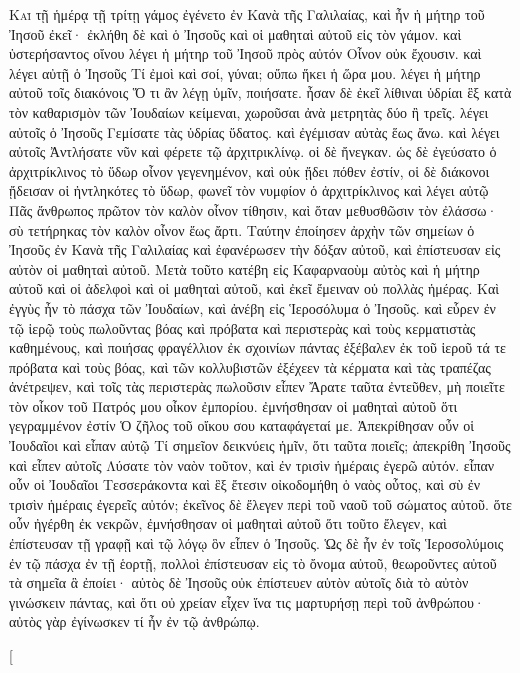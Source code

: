 \begin{pages}
    \begin{Rightside}
        \beginnumbering
		\renewcommand{\LettrineFontHook}{\PHtitl}
		\lettrine[lines=3]{Κ}{αὶ} τῇ ἡμέρᾳ τῇ τρίτῃ γάμος ἐγένετο ἐν Κανὰ τῆς Γαλιλαίας, καὶ ἦν ἡ μήτηρ τοῦ Ἰησοῦ ἐκεῖ· ἐκλήθη δὲ καὶ ὁ Ἰησοῦς καὶ οἱ μαθηταὶ αὐτοῦ εἰς τὸν γάμον. καὶ ὑστερήσαντος οἴνου λέγει ἡ μήτηρ τοῦ Ἰησοῦ πρὸς αὐτόν Οἶνον οὐκ ἔχουσιν. καὶ λέγει αὐτῇ ὁ Ἰησοῦς Τί ἐμοὶ καὶ σοί, γύναι; οὔπω ἥκει ἡ ὥρα μου. λέγει ἡ μήτηρ αὐτοῦ τοῖς διακόνοις Ὅ τι ἂν λέγῃ ὑμῖν, ποιήσατε. ἦσαν δὲ ἐκεῖ λίθιναι ὑδρίαι ἓξ κατὰ τὸν καθαρισμὸν τῶν Ἰουδαίων κείμεναι, χωροῦσαι ἀνὰ μετρητὰς δύο ἢ τρεῖς. λέγει αὐτοῖς ὁ Ἰησοῦς Γεμίσατε τὰς ὑδρίας ὕδατος. καὶ ἐγέμισαν αὐτὰς ἕως ἄνω. καὶ λέγει αὐτοῖς Ἀντλήσατε νῦν καὶ φέρετε τῷ ἀρχιτρικλίνῳ. οἱ δὲ ἤνεγκαν. ὡς δὲ ἐγεύσατο ὁ ἀρχιτρίκλινος τὸ ὕδωρ οἶνον γεγενημένον, καὶ οὐκ ᾔδει πόθεν ἐστίν, οἱ δὲ διάκονοι ᾔδεισαν οἱ ἠντληκότες τὸ ὕδωρ, φωνεῖ τὸν νυμφίον ὁ ἀρχιτρίκλινος καὶ λέγει αὐτῷ Πᾶς ἄνθρωπος πρῶτον τὸν καλὸν οἶνον τίθησιν, καὶ ὅταν μεθυσθῶσιν τὸν ἐλάσσω· σὺ τετήρηκας τὸν καλὸν οἶνον ἕως ἄρτι. Ταύτην ἐποίησεν ἀρχὴν τῶν σημείων ὁ Ἰησοῦς ἐν Κανὰ τῆς Γαλιλαίας καὶ ἐφανέρωσεν τὴν δόξαν αὐτοῦ, καὶ ἐπίστευσαν εἰς αὐτὸν οἱ μαθηταὶ αὐτοῦ.
		\pend
		\pstart
		Μετὰ τοῦτο κατέβη εἰς Καφαρναοὺμ αὐτὸς καὶ ἡ μήτηρ αὐτοῦ καὶ οἱ ἀδελφοὶ καὶ οἱ μαθηταὶ αὐτοῦ, καὶ ἐκεῖ ἔμειναν οὐ πολλὰς ἡμέρας. Καὶ ἐγγὺς ἦν τὸ πάσχα τῶν Ἰουδαίων, καὶ ἀνέβη εἰς Ἱεροσόλυμα ὁ Ἰησοῦς. καὶ εὗρεν ἐν τῷ ἱερῷ τοὺς πωλοῦντας βόας καὶ πρόβατα καὶ περιστερὰς καὶ τοὺς κερματιστὰς καθημένους, καὶ ποιήσας φραγέλλιον ἐκ σχοινίων πάντας ἐξέβαλεν ἐκ τοῦ ἱεροῦ τά τε πρόβατα καὶ τοὺς βόας, καὶ τῶν κολλυβιστῶν ἐξέχεεν τὰ κέρματα καὶ τὰς τραπέζας ἀνέτρεψεν, καὶ τοῖς τὰς περιστερὰς πωλοῦσιν εἶπεν Ἄρατε ταῦτα ἐντεῦθεν, μὴ ποιεῖτε τὸν οἶκον τοῦ Πατρός μου οἶκον ἐμπορίου. ἐμνήσθησαν οἱ μαθηταὶ αὐτοῦ ὅτι γεγραμμένον ἐστίν Ὁ ζῆλος τοῦ οἴκου σου καταφάγεταί με. 
		\pend
		\pstart
		Ἀπεκρίθησαν οὖν οἱ Ἰουδαῖοι καὶ εἶπαν αὐτῷ Τί σημεῖον δεικνύεις ἡμῖν, ὅτι ταῦτα ποιεῖς; ἀπεκρίθη Ἰησοῦς καὶ εἶπεν αὐτοῖς Λύσατε τὸν ναὸν τοῦτον, καὶ ἐν τρισὶν ἡμέραις ἐγερῶ αὐτόν. εἶπαν οὖν οἱ Ἰουδαῖοι Τεσσεράκοντα καὶ ἓξ ἔτεσιν οἰκοδομήθη ὁ ναὸς οὗτος, καὶ σὺ ἐν τρισὶν ἡμέραις ἐγερεῖς αὐτόν; ἐκεῖνος δὲ ἔλεγεν περὶ τοῦ ναοῦ τοῦ σώματος αὐτοῦ. ὅτε οὖν ἠγέρθη ἐκ νεκρῶν, ἐμνήσθησαν οἱ μαθηταὶ αὐτοῦ ὅτι τοῦτο ἔλεγεν, καὶ ἐπίστευσαν τῇ γραφῇ καὶ τῷ λόγῳ ὃν εἶπεν ὁ Ἰησοῦς. Ὡς δὲ ἦν ἐν τοῖς Ἱεροσολύμοις ἐν τῷ πάσχα ἐν τῇ ἑορτῇ, πολλοὶ ἐπίστευσαν εἰς τὸ ὄνομα αὐτοῦ, θεωροῦντες αὐτοῦ τὰ σημεῖα ἃ ἐποίει· αὐτὸς δὲ Ἰησοῦς οὐκ ἐπίστευεν αὑτὸν αὐτοῖς διὰ τὸ αὐτὸν γινώσκειν πάντας, καὶ ὅτι οὐ χρείαν εἶχεν ἵνα τις μαρτυρήσῃ περὶ τοῦ ἀνθρώπου· αὐτὸς γὰρ ἐγίνωσκεν τί ἦν ἐν τῷ ἀνθρώπῳ.
		\pend
        \endnumbering
    \end{Rightside}
    \begin{Leftside}
        \beginnumbering
        \pstart[

\end{Leftside}
\end{pages}
